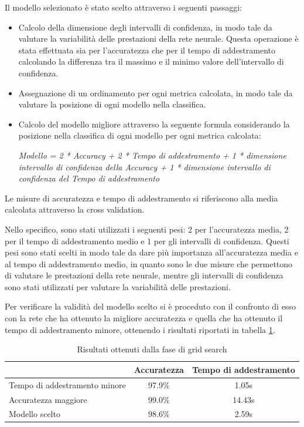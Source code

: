 Il modello selezionato è stato scelto attraverso i seguenti passaggi:
\begin{itemize}
    \item Calcolo della dimensione degli intervalli di confidenza, in modo tale
          da valutare la variabilità delle prestazioni della rete neurale.
          Questa operazione è stata effettuata sia per l'accuratezza che per il
          tempo di addestramento calcolando la differenza tra il massimo e il
          minimo valore dell'intervallo di confidenza.
    \item Assegnazione di un ordinamento per ogni metrica calcolata, in modo tale
          da valutare la posizione di ogni modello nella classifica.
    \item Calcolo del modello migliore attraverso la seguente formula considerando
          la posizione nella classifica di ogni modello per ogni metrica calcolata:
          \begin{center}
              \textit{Modello = 2 * Accuracy + 2 * Tempo di addestramento + 1 * dimensione intervallo di confidenza della Accuracy + 1 * dimensione intervallo di confidenza del Tempo di addestramento}
          \end{center}
\end{itemize}
Le misure di accuratezza e tempo di addestramento si riferiscono alla media
calcolata attraverso la cross validation.

Nello specifico, sono stati utilizzati i seguenti pesi: 2 per l'accuratezza
media, 2 per il tempo di addestramento medio e 1 per gli intervalli di
confidenza. Questi pesi sono stati scelti in modo tale da dare più importanza
all'accuratezza media e al tempo di addestramento medio, in quanto sono le due
misure che permettono di valutare le prestazioni della rete neurale, mentre gli
intervalli di confidenza sono stati utilizzati per valutare la variabilità delle
prestazioni.

Per verificare la validità del modello scelto si è proceduto con il confronto di
esso con la rete che ha ottenuto la migliore accuratezza e quella che ha ottenuto
il tempo di addestramento minore, ottenendo i risultati riportati in tabella \ref{tab:ris-grid-search}.
\begin{table}[ht]
    \centering
    \begin{tabular}{@{}lcc@{}}
        \toprule
        \rowcolor[HTML]{EFEFEF}
        \multicolumn{1}{c}{\cellcolor[HTML]{EFEFEF}\textbf{Modello}} & \textbf{Accuratezza} & \textbf{Tempo di addestramento} \\ \midrule
        Tempo di addestramento minore                                & 97.9\%               & 1.05s                           \\
        Accuratezza maggiore                                         & 99.0\%               & 14.43s                          \\
        Modello scelto                                               & 98.6\%               & 2.59s                           \\ \bottomrule
    \end{tabular}
    \caption{Risultati ottenuti dalla fase di grid search}
    \label{tab:ris-grid-search}
\end{table}

